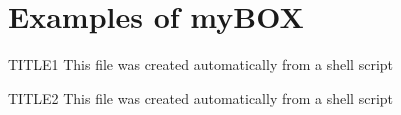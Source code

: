 \documentclass[12pt,a4paper]{article}
\begin{document}
	
%
%


%
%

\listofmyOUT
\newpage



%
%

\section{Examples of myBOX}

\begin{myOUTlst}{TITLE1}{}
This file was created automatically from
a shell script
\end{myOUTlst}

\begin{myOUTlst}{TITLE2}{}
This file was created automatically from
a shell script
\end{myOUTlst}

%
%
\end{document}
